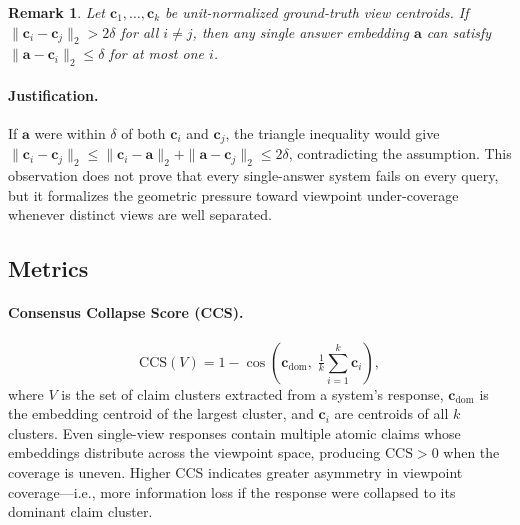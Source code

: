 \documentclass[11pt]{article}
\newtheorem{remark}{Remark}
\begin{document}
\begin{remark}
\label{prop:single-view-bound}
Let $\mathbf{c}_1,\ldots,\mathbf{c}_k$ be unit-normalized ground-truth view
centroids.  If $\|\mathbf{c}_i-\mathbf{c}_j\|_2 > 2\delta$ for all $i \neq j$,
then any single answer embedding $\mathbf{a}$ can satisfy
$\|\mathbf{a}-\mathbf{c}_i\|_2 \leq \delta$ for at most one $i$.
\end{remark}

\paragraph{Justification.}
If $\mathbf{a}$ were within $\delta$ of both $\mathbf{c}_i$ and
$\mathbf{c}_j$, the triangle inequality would give
$\|\mathbf{c}_i-\mathbf{c}_j\|_2 \leq
\|\mathbf{c}_i-\mathbf{a}\|_2 + \|\mathbf{a}-\mathbf{c}_j\|_2 \leq 2\delta$,
contradicting the assumption.  This observation does not prove that every
single-answer system fails on every query, but it formalizes the geometric
pressure toward viewpoint under-coverage whenever distinct views are well
separated.

\subsection{Metrics}
\label{sec:metrics}

\paragraph{Consensus Collapse Score (CCS).}
\begin{equation}
\label{eq:ccs}
\mathrm{CCS}(V) = 1 - \cos\!\left(\mathbf{c}_\mathrm{dom},\;
  \tfrac{1}{k}\sum_{i=1}^{k}\mathbf{c}_i\right),
\end{equation}
where $V$ is the set of claim clusters extracted from a system's response,
$\mathbf{c}_\mathrm{dom}$ is the embedding centroid of the largest cluster,
and $\mathbf{c}_i$ are centroids of all $k$ clusters.  Even single-view
responses contain multiple atomic claims whose embeddings distribute across
the viewpoint space, producing $\mathrm{CCS}{>}0$ when the coverage is uneven.
Higher CCS indicates greater asymmetry in viewpoint coverage---i.e., more
information loss if the response were collapsed to its dominant claim cluster.
\end{document}
